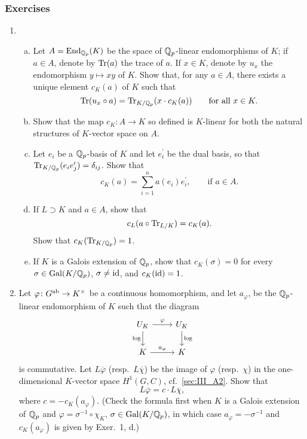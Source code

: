 \begin{subappendices}
\subsubsection*{Exercises}
\begin{enumerate}
\item \begin{enumerate}[a)]
	\item Let $A = \operatorname{End}_{\mathbb{Q}_p}(K)$ be the space of $\mathbb{Q}_p$-linear
		endomorphisms of $K$; if $a \in A$, denote by $\operatorname{Tr}(a)$ the
		trace of $a$. If $x \in K$, denote by $u_x$ the endomorphism $y
		\mapsto xy$ of $K$. Show that, for any $a \in A$, there exists
		a unique element $c_K(a)$ of $K$ such that
		\[
			\operatorname{Tr}(u_x \circ a) = \operatorname{Tr}_{K/\mathbb{Q}_p}(x\cdot c_K(a)) \qquad
			\text{for all } x\in K.
		\]
	\item  Show that the map $c_K \colon A \to K$ so defined is $K$-linear
		for both the natural structures of $K$-vector space on $A$.
	\item  Let $e_i$ be a $\mathbb{Q}_p$-basis of $K$ and let $e_i^\prime$ be the
		\dpage
		dual basis, so that $\operatorname{Tr}_{K/\mathbb{Q}_p}(e_i e_j^\prime) =
		\delta_{ij}$. Show that
		\[
			c_K(a) = \sum_{i=1}^{n} a(e_i) e_i^\prime,
			\qquad \text{if } a \in A.
		\]
	\item If $L \supset K$ and $a \in A$, show that
		\[
			c_L(a \circ \operatorname{Tr}_{L/K}) = c_K(a).
		\]
		Show that $c_K(\operatorname{Tr}_{K/\mathbb{Q}_p}) = 1$.
	\item  If $K$ is a Galois extension of $\mathbb{Q}_p$, show that $c_K(\sigma) =
		0$ for every $\sigma \in \operatorname{Gal}(K/\mathbb{Q}_p)$, $\sigma \ne \operatorname{id}$, and
		$c_K(\operatorname{id}) = 1$.
\end{enumerate}
\item Let $\varphi \colon G^{\mathrm{ab}} \to K^\times$ be a continuous homomorphism,
	and let $a_\varphi$, be the $\mathbb{Q}_p$-linear endomorphism of $K$ such that
	the diagram
	\[\begin{tikzcd}
		U_K \rar["\varphi"] \dar["\log"'] & U_K \dar["\log"] \\
		K \rar["a_\varphi"] & K
	\end{tikzcd}\]
	is commutative. Let $L\overline{\varphi}$ (resp.\ $L\overline{\chi}$)
	be the image of $\varphi$ (resp.\ $\chi$) in the one-dimensional
	$K$-vector space $H^1(G,C)$, cf.\ \ref{sec:III_A2}. Show that
	\[
		L\overline{\varphi} = c \cdot L\overline{\chi},
	\]
	where $c = -c_K(a_\varphi)$. (Check the formula first when $K$ is a
	Galois extension of $\mathbb{Q}_p$ and $\varphi = \sigma^{-1}\circ \chi_K$,
	\dpage
	$\sigma \in \operatorname{Gal}(K/\mathbb{Q}_p)$, in which case $a_\varphi = -\sigma^{-1}$ and
	$c_K(a_\varphi)$ is given by Exer.~1, d.)


\end{enumerate}
\end{subappendices}
